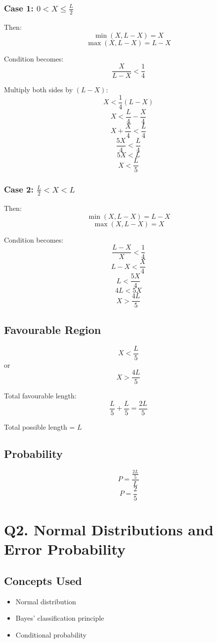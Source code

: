\documentclass[11pt]{article}
\begin{document}
\subsubsection*{Case 1: $0 < X \le \frac{L}{2}$}

Then:
\[
\min(X, L-X) = X
\]
\[
\max(X, L-X) = L-X
\]

Condition becomes:
\[
\frac{X}{L-X} < \frac{1}{4}
\]

Multiply both sides by $(L-X)$:
\[
X < \frac{1}{4}(L-X)
\]
\[
X < \frac{L}{4} - \frac{X}{4}
\]
\[
X + \frac{X}{4} < \frac{L}{4}
\]
\[
\frac{5X}{4} < \frac{L}{4}
\]
\[
5X < L
\]
\[
X < \frac{L}{5}
\]

\subsubsection*{Case 2: $\frac{L}{2} < X < L$}

Then:
\[
\min(X, L-X) = L-X
\]
\[
\max(X, L-X) = X
\]

Condition becomes:
\[
\frac{L-X}{X} < \frac{1}{4}
\]
\[
L-X < \frac{X}{4}
\]
\[
L < \frac{5X}{4}
\]
\[
4L < 5X
\]
\[
X > \frac{4L}{5}
\]

\subsection*{Favourable Region}

\[
X < \frac{L}{5}
\]
or
\[
X > \frac{4L}{5}
\]

Total favourable length:
\[
\frac{L}{5} + \frac{L}{5} = \frac{2L}{5}
\]

Total possible length = $L$

\subsection*{Probability}

\[
P = \frac{\frac{2L}{5}}{L}
\]
\[
P = \frac{2}{5}
\]

\newpage

\section*{Q2. Normal Distributions and Error Probability}

\subsection*{Concepts Used}

\begin{itemize}
\item Normal distribution
\item Bayes’ classification principle
\item Conditional probability
\end{itemize}
\end{document}
